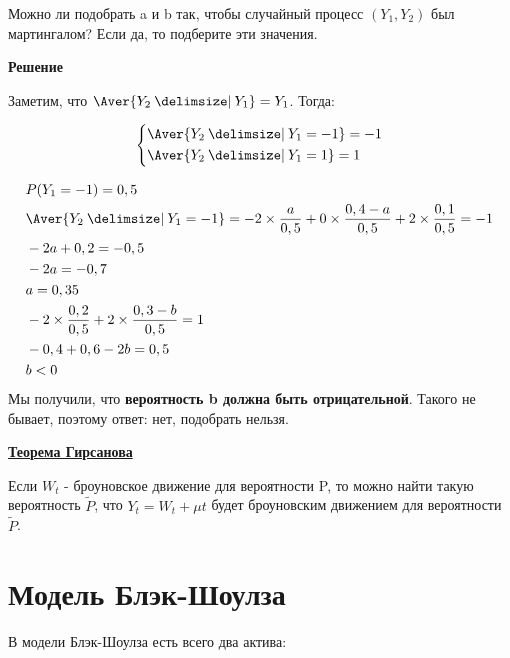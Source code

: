\documentclass[a4paper]{article}
\providecommand\given{}
\renewcommand\given{  \nonscript\:
  \delimsize\vert
  \nonscript\:
  \mathopen{}
  \allowbreak}
\begin{document}
Можно ли подобрать a и b так, чтобы случайный процесс $(Y_1,Y_2)$ был мартингалом? Если да, то подберите эти значения.
  \vspace{5mm}

\par {\bf{Решение}}

Заметим, что $\Aver{Y_2 \given Y_1} = Y_1$. Тогда:

\[
	\left\{
		\begin{aligned}
			&\Aver{Y_2 \given Y_1 = -1} = -1  \\
			&\Aver{Y_2 \given Y_1 = 1 } = 1   \\
		\end{aligned}
	\right.
\]


  \begin{align*}
    & P (Y_1=-1) = 0,5 \\
    &\Aver{Y_2 \given Y_1=-1} = -2 \times \frac{a}{0,5} + 0 \times \frac{0,4-a}{0,5} + 2 \times \frac{0,1}{0,5} = -1 \\
    &-2a+0,2=-0,5 \\
    &-2a=-0,7 \\
    &a=0,35 \\
    &-2 \times \frac{0,2}{0,5} + 2 \times \frac{0,3 - b}{0,5} =1 \\
    &-0,4 + 0,6 -2b =0,5\\
    &b  <0
 \end{align*}
Мы получили, что \textbf{вероятность b должна быть отрицательной}. Такого не бывает, поэтому ответ: нет, подобрать нельзя.


  \vspace{5mm}

  \par {\bf\underline{Теорема Гирсанова}}

Если $W_t$ - броуновское движение для вероятности P, то можно найти такую вероятность $\tilde{P}$, что $Y_t = W_t + \mu t$ будет броуновским движением для вероятности $\tilde{P}$.



 \section {Модель Блэк-Шоулза}

 В модели Блэк-Шоулза есть всего два актива:
\end{document}
